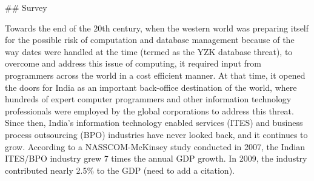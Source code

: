 ## Survey 

Towards the end of the 20th century, when the western world was preparing itself for the possible risk of computation and database management because of the way dates were handled at the time (termed as the YZK database threat), to overcome and address this issue of computing, it required input from programmers across the world in a cost efficient manner. At that time, it opened the doors for India as an important back-office destination of the world, where hundreds of expert computer programmers and other information technology professionals were employed by the global corporations to address this threat. Since then, India's information technology enabled services (ITES) and business process outsourcing (BPO) industries  have never looked back, and it continues to grow. According to a NASSCOM-McKinsey study  conducted in 2007, the Indian ITES/BPO industry grew 7 times the annual GDP growth. In 2009, the industry contributed nearly 2.5\% to the GDP (need to add a citation).

    
    